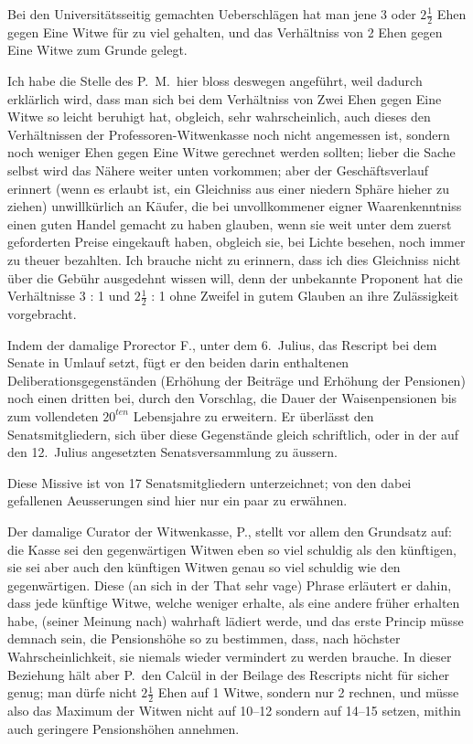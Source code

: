 \documentclass[12pt,a4paper]{article}
\begin{document}
Bei den Universit\"atsseitig gemachten Ueberschl\"agen hat man jene 3 oder $2\frac{1}{2}$ Ehen gegen Eine Witwe f\"ur zu viel gehalten, und das Verh\"altniss von 2 Ehen gegen Eine Witwe zum Grunde gelegt.

Ich habe die Stelle des P.\ M.\ hier bloss deswegen angef\"uhrt, weil dadurch erkl\"arlich wird, dass man sich bei dem Verh\"altniss von Zwei Ehen gegen Eine Witwe so leicht beruhigt hat, obgleich, sehr wahrscheinlich, auch dieses den Verh\"altnissen der Professoren-Witwenkasse noch nicht angemessen ist, sondern noch weniger Ehen gegen Eine Witwe gerechnet werden sollten; lieber die Sache selbst wird das N\"ahere weiter unten vorkommen; aber der Gesch\"aftsverlauf erinnert (wenn es erlaubt ist, ein Gleichniss aus einer niedern Sph\"are hieher zu ziehen) unwillk\"urlich an K\"aufer, die bei unvollkommener eigner Waarenkenntniss einen guten Handel gemacht zu haben glauben, wenn sie weit unter dem zuerst geforderten Preise eingekauft haben, obgleich sie, bei Lichte besehen, noch immer zu theuer bezahlten. Ich brauche nicht zu erinnern, dass ich dies Gleichniss nicht \"uber die Geb\"uhr ausgedehnt wissen will, denn der unbekannte Proponent hat die Verh\"altnisse 3 : 1 und $2\frac{1}{2}$ : 1 ohne Zweifel in gutem Glauben an ihre Zul\"assigkeit vorgebracht.

Indem der damalige Prorector F., unter dem 6.\ Julius, das Rescript bei dem Senate in Umlauf setzt, f\"ugt er den beiden darin enthaltenen Deliberationsgegenst\"anden (Erh\"ohung der Beitr\"age und Erh\"ohung der Pensionen) noch einen dritten bei, durch den Vorschlag, die Dauer der Waisenpensionen bis zum vollendeten $20^{ten}$ Lebensjahre zu erweitern. Er \"uberl\"asst den Senatsmitgliedern, sich \"uber diese Gegenst\"ande gleich schriftlich, oder in der auf den 12.\ Julius angesetzten Senatsversammlung zu \"aussern.

Diese Missive ist von 17 Senatsmitgliedern unterzeichnet; von den dabei gefallenen Aeusserungen sind hier nur ein paar zu erw\"ahnen.

Der damalige Curator der Witwenkasse, P., stellt vor allem den Grundsatz auf: die Kasse sei den gegenw\"artigen Witwen eben so viel schuldig als den k\"unftigen, sie sei aber auch den k\"unftigen Witwen genau so viel schuldig wie den gegenw\"artigen. Diese (an sich in der That sehr vage) Phrase erl\"autert er dahin, dass jede k\"unftige Witwe, welche weniger erhalte, als eine andere fr\"uher erhalten habe, (seiner Meinung nach) wahrhaft l\"adiert werde, und das erste Princip m\"usse demnach sein, die Pensionsh\"ohe so zu bestimmen, dass, nach h\"ochster Wahrscheinlichkeit, sie niemals wieder vermindert zu werden brauche. In dieser Beziehung h\"alt aber P.\ den Calc\"ul in der Beilage des Rescripts nicht f\"ur sicher genug; man d\"urfe nicht $2\frac{1}{2}$ Ehen auf 1 Witwe, sondern nur 2 rechnen, und m\"usse also das Maximum der Witwen nicht auf 10--12 sondern auf 14--15 setzen, mithin auch geringere Pensionsh\"ohen annehmen.
\end{document}
